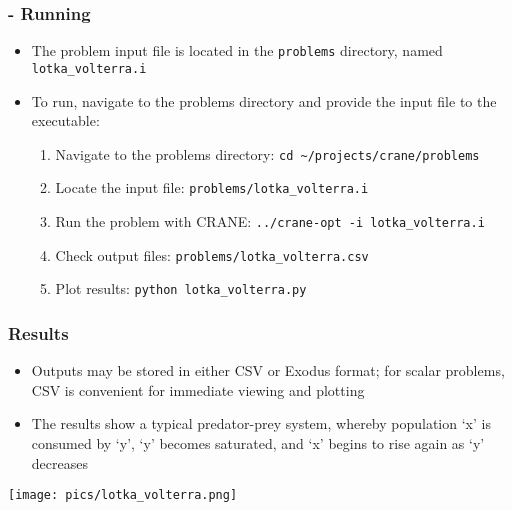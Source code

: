 \begin{frame}[fragile]
	\frametitle{\insertsubsectionhead \hspace{1pt} - Running}
		\begin{itemize}
			\item The problem input file is located in the \texttt{problems} directory, named \texttt{lotka\_volterra.i}
			\item To run, navigate to the problems directory and provide the input file to the executable:
			\begin{enumerate}
				\item Navigate to the problems directory: \newline
				\hspace*{8pt} \texttt{cd \textasciitilde/projects/crane/problems}
				\item Locate the input file: \newline
				\hspace*{8pt} \texttt{problems/lotka\_volterra.i}
				\item Run the problem with CRANE: \newline
				\hspace*{8pt} \texttt{../crane-opt -i lotka\_volterra.i}
				\item Check output files: \newline
				\hspace*{8pt} \texttt{problems/lotka\_volterra.csv}
				\item Plot results: \newline
				\hspace*{8pt} \texttt{python lotka\_volterra.py}
			\end{enumerate}
		\end{itemize}
\end{frame}

\begin{frame}
	\frametitle{\insertsubsectionhead \hspace{1pt} Results}
	\begin{minipage}{0.5\linewidth}
		\begin{itemize}
			\item Outputs may be stored in either CSV or Exodus format; for scalar problems, CSV is convenient for immediate viewing and plotting
			\item The results show a typical predator-prey system, whereby population `x' is consumed by `y', `y' becomes saturated, and `x' begins to rise again as `y' decreases
		\end{itemize}
	\end{minipage}%
	\begin{minipage}{0.5\linewidth}
	\centering
	\texttt{[image: pics/lotka\_volterra.png]}
	\end{minipage}
\end{frame}